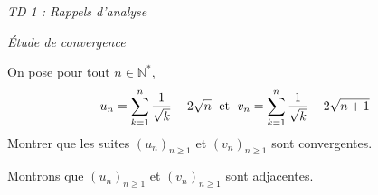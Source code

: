 \documentclass[a4paper,10pt]{report}
\begin{document}
\everymath{\displaystyle}


\begin{center}
\textit{{ {\huge TD 1 : Rappels d'analyse}}}
\end{center}
\bigskip


\begin{center}
\textit{{ {\large Étude de convergence}}}
\end{center}



\setlength{\shadowsize}{2pt} 



\begin{Exa}
On pose pour tout $n \in \mathbb{N}^*$, 
    \[
    u_n = \sum_{k = 1}^n {\frac{1}{\sqrt k}} - 2\sqrt n \; \hbox{ et } \; v_n = \sum_{k = 1}^n {\frac{1}{\sqrt k}} - 2\sqrt {n + 1}
    \]
 Montrer que les suites $(u_n)_{n \geq 1}$ et $(v_n)_{n \geq 1}$ sont convergentes.
 \end{Exa}
 
 \corr Montrons que $(u_n)_{n \geq 1}$ et $(v_n)_{n \geq 1}$ sont adjacentes.
\end{document}
